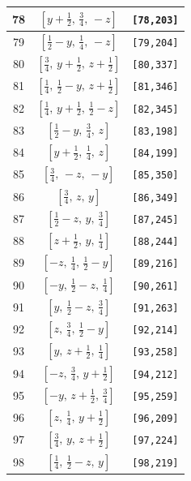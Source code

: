 \documentclass[fleqn,8pt]{jsarticle}
\begin{document}
\begin{longtable}{ccc}
78 & $\left[ y + \frac{1}{2},\, \frac{3}{4},\, - z \right]$ & {\tt [78,203]} \\ \hline
79 & $\left[ \frac{1}{2} - y,\, \frac{1}{4},\, - z \right]$ & {\tt [79,204]} \\ \hline
80 & $\left[ \frac{3}{4},\, y + \frac{1}{2},\, z + \frac{1}{2} \right]$ & {\tt [80,337]} \\ \hline
81 & $\left[ \frac{1}{4},\, \frac{1}{2} - y,\, z + \frac{1}{2} \right]$ & {\tt [81,346]} \\ \hline
82 & $\left[ \frac{1}{4},\, y + \frac{1}{2},\, \frac{1}{2} - z \right]$ & {\tt [82,345]} \\ \hline
83 & $\left[ \frac{1}{2} - y,\, \frac{3}{4},\, z \right]$ & {\tt [83,198]} \\ \hline
84 & $\left[ y + \frac{1}{2},\, \frac{1}{4},\, z \right]$ & {\tt [84,199]} \\ \hline
85 & $\left[ \frac{3}{4},\, - z,\, - y \right]$ & {\tt [85,350]} \\ \hline
86 & $\left[ \frac{3}{4},\, z,\, y \right]$ & {\tt [86,349]} \\ \hline
87 & $\left[ \frac{1}{2} - z,\, y,\, \frac{3}{4} \right]$ & {\tt [87,245]} \\ \hline
88 & $\left[ z + \frac{1}{2},\, y,\, \frac{1}{4} \right]$ & {\tt [88,244]} \\ \hline
89 & $\left[ - z,\, \frac{1}{4},\, \frac{1}{2} - y \right]$ & {\tt [89,216]} \\ \hline
90 & $\left[ - y,\, \frac{1}{2} - z,\, \frac{1}{4} \right]$ & {\tt [90,261]} \\ \hline
91 & $\left[ y,\, \frac{1}{2} - z,\, \frac{3}{4} \right]$ & {\tt [91,263]} \\ \hline
92 & $\left[ z,\, \frac{3}{4},\, \frac{1}{2} - y \right]$ & {\tt [92,214]} \\ \hline
93 & $\left[ y,\, z + \frac{1}{2},\, \frac{1}{4} \right]$ & {\tt [93,258]} \\ \hline
94 & $\left[ - z,\, \frac{3}{4},\, y + \frac{1}{2} \right]$ & {\tt [94,212]} \\ \hline
95 & $\left[ - y,\, z + \frac{1}{2},\, \frac{3}{4} \right]$ & {\tt [95,259]} \\ \hline
96 & $\left[ z,\, \frac{1}{4},\, y + \frac{1}{2} \right]$ & {\tt [96,209]} \\ \hline
97 & $\left[ \frac{3}{4},\, y,\, z + \frac{1}{2} \right]$ & {\tt [97,224]} \\ \hline
98 & $\left[ \frac{1}{4},\, \frac{1}{2} - z,\, y \right]$ & {\tt [98,219]} \\ \hline

\end{longtable}
\end{document}
